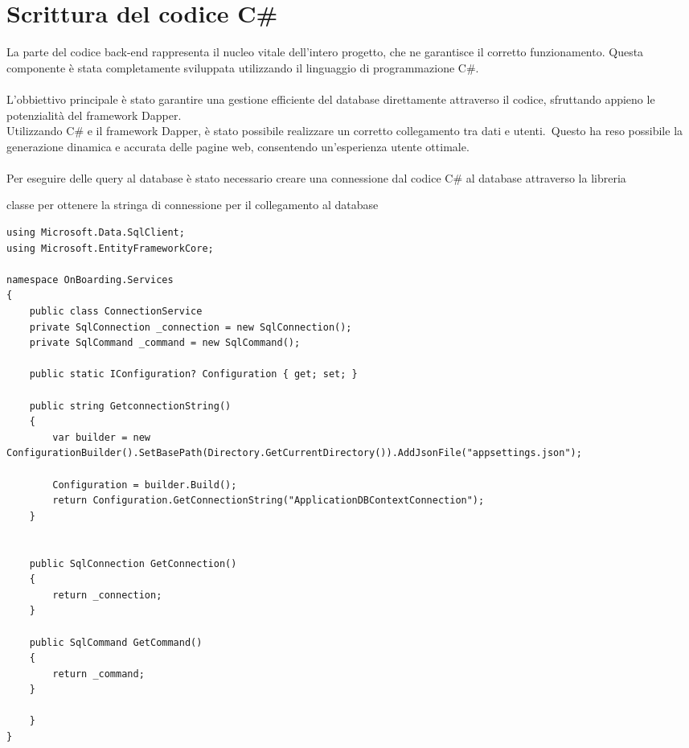\section{Scrittura del codice C\#}\label{sec:cap_sec_subsec}
La parte del codice back-end rappresenta il nucleo vitale dell'intero progetto, 
che ne garantisce il corretto funzionamento. Questa componente è stata completamente 
sviluppata utilizzando il linguaggio di programmazione C\#.
\\ \\
L'obbiettivo principale è stato garantire una gestione efficiente del database
direttamente attraverso il codice, sfruttando appieno le potenzialità del
framework Dapper. \\ 
Utilizzando C\# e il framework Dapper, è stato possibile
realizzare un corretto collegamento tra dati e utenti.\ Questo ha reso
possibile la generazione dinamica e accurata delle pagine web, consentendo
un'esperienza utente ottimale. 
\\ \\ 
Per eseguire delle query al database è
stato necessario creare una connessione dal codice C\# al database attraverso
la libreria 
%
\begin{algorithm}[H]
	\caption{classe per ottenere la stringa di connessione per il collegamento al database}
	\label{lst:genic_mpi}
	\begin{lstlisting}[label=lst:test]
using Microsoft.Data.SqlClient;
using Microsoft.EntityFrameworkCore;

namespace OnBoarding.Services
{
	public class ConnectionService
	private SqlConnection _connection = new SqlConnection();
	private SqlCommand _command = new SqlCommand();

	public static IConfiguration? Configuration { get; set; }

	public string GetconnectionString()
	{
		var builder = new ConfigurationBuilder().SetBasePath(Directory.GetCurrentDirectory()).AddJsonFile("appsettings.json");

		Configuration = builder.Build();
		return Configuration.GetConnectionString("ApplicationDBContextConnection");
	}


	public SqlConnection GetConnection() 
	{
		return _connection;
	}

	public SqlCommand GetCommand()
	{
		return _command;
	}

	}
}
	\end{lstlisting}
\end{algorithm}
